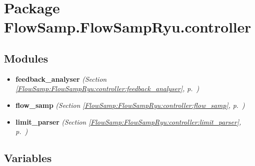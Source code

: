 %
%
%


\section{Package FlowSamp.FlowSampRyu.controller}

    \label{FlowSamp:FlowSampRyu:controller}


\subsection{Modules}

\begin{itemize}
\setlength{\parskip}{0ex}
\item \textbf{feedback\_analyser}
  \textit{(Section \ref{FlowSamp:FlowSampRyu:controller:feedback_analyser}, p.~\pageref{FlowSamp:FlowSampRyu:controller:feedback_analyser})}

\item \textbf{flow\_samp}
  \textit{(Section \ref{FlowSamp:FlowSampRyu:controller:flow_samp}, p.~\pageref{FlowSamp:FlowSampRyu:controller:flow_samp})}

\item \textbf{limit\_parser}
  \textit{(Section \ref{FlowSamp:FlowSampRyu:controller:limit_parser}, p.~\pageref{FlowSamp:FlowSampRyu:controller:limit_parser})}

\end{itemize}



  \subsection{Variables}


